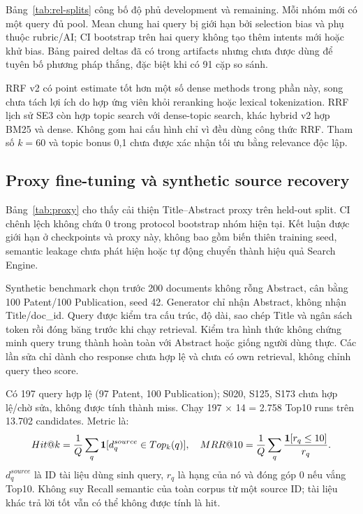 
Bảng~\ref{tab:rel-splits} công bố độ phủ development và remaining. Mỗi nhóm mới có một query đủ pool. Mean chung hai query bị giới hạn bởi selection bias và phụ thuộc rubric/AI; CI bootstrap trên hai query không tạo thêm intents mới hoặc khử bias. Bảng paired deltas đã có trong artifacts nhưng chưa được dùng để tuyên bố phương pháp thắng, đặc biệt khi có 91 cặp so sánh.

RRF v2 có point estimate tốt hơn một số dense methods trong phần này, song chưa tách lợi ích do hợp ứng viên khỏi reranking hoặc lexical tokenization. RRF lịch sử SE3 còn hợp topic search với dense-topic search, khác hybrid v2 hợp BM25 và dense. Không gom hai cấu hình chỉ vì đều dùng công thức RRF. Tham số $k=60$ và topic bonus 0,1 chưa được xác nhận tối ưu bằng relevance độc lập.

\subsection{Proxy fine-tuning và synthetic source recovery}


Bảng~\ref{tab:proxy} cho thấy cải thiện Title--Abstract proxy trên held-out split. CI chênh lệch không chứa 0 trong protocol bootstrap nhóm hiện tại. Kết luận được giới hạn ở checkpoints và proxy này, không bao gồm biến thiên training seed, semantic leakage chưa phát hiện hoặc tự động chuyển thành hiệu quả Search Engine.

Synthetic benchmark chọn trước 200 documents không rỗng Abstract, cân bằng 100 Patent/100 Publication, seed 42. Generator chỉ nhận Abstract, không nhận Title/doc\_id. Query được kiểm tra cấu trúc, độ dài, sao chép Title và ngân sách token rồi đóng băng trước khi chạy retrieval. Kiểm tra hình thức không chứng minh query trung thành hoàn toàn với Abstract hoặc giống người dùng thực. Các lần sửa chỉ dành cho response chưa hợp lệ và chưa có own retrieval, không chỉnh query theo score.

Có 197 query hợp lệ (97 Patent, 100 Publication); S020, S125, S173 chưa hợp lệ/chờ sửa, không được tính thành miss. Chạy 197 $\times$ 14 = 2.758 Top10 runs trên 13.702 candidates. Metric là:
\begin{equation}\label{eq:hit}
Hit@k=\frac1Q\sum_q\mathbf{1}[d_q^{source}\in Top_k(q)],\quad
MRR@10=\frac1Q\sum_q\frac{\mathbf{1}[r_q\le10]}{r_q}.
\end{equation}
$d_q^{source}$ là ID tài liệu dùng sinh query, $r_q$ là hạng của nó và đóng góp 0 nếu vắng Top10. Không suy Recall semantic của toàn corpus từ một source ID; tài liệu khác trả lời tốt vẫn có thể không được tính là hit.



